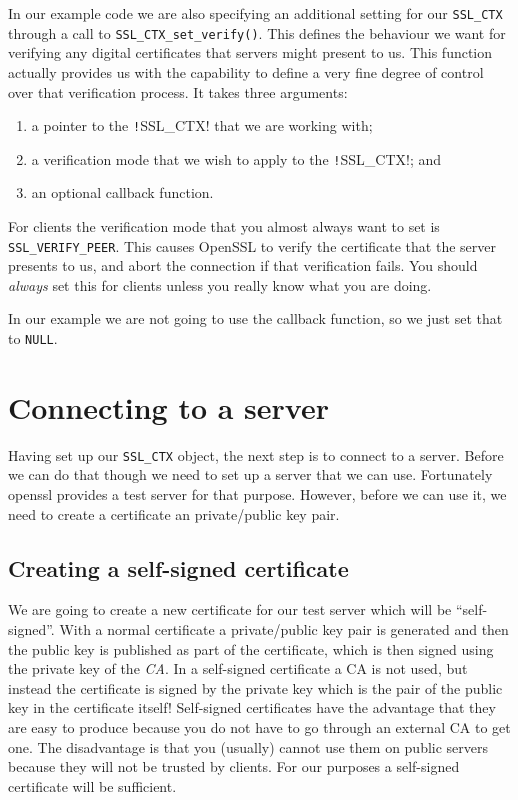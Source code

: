 In our example code we are also specifying an additional setting for our
\verb!SSL_CTX! through a call to \verb!SSL_CTX_set_verify()!. This defines the 
behaviour we want for verifying any digital certificates that servers might
present to us. This function actually provides us with the capability to define 
a very fine degree of control over that verification process. It takes three 
arguments:
\begin{enumerate}
\item a pointer to the \texttt!SSL\_CTX! that we are working with;
\item a verification mode that we wish to apply to the \texttt!SSL\_CTX!; and
\item an optional callback function.
\end{enumerate}

For clients the verification mode that you almost always want to set is 
\verb!SSL_VERIFY_PEER!. This causes OpenSSL to verify the certificate that the 
server presents to us, and abort the connection if that verification fails. You
should \emph{always} set this for clients unless you really know what you are 
doing.

In our example we are not going to use the callback function, so we just set 
that to \verb!NULL!.

\section {Connecting to a server}

Having set up our \verb!SSL_CTX! object, the next step is to connect to a
server.  Before we can do that though we need to set up a server that we can
use.  Fortunately openssl provides a test server for that purpose. However,
before we  can use it, we need to create a certificate an private/public key
pair.

\subsection {Creating a self-signed certificate}

We are going to create a new certificate for our test server which will be 
``self-signed''. With a normal certificate a private/public key pair is
generated and then the public key is published as part of the certificate, 
which is then signed using the private key of the \emph{CA}. In a self-signed 
certificate a CA is not used, but instead the certificate is signed by the 
private key which is the pair of the public key in the certificate itself! 
Self-signed certificates have the advantage that they are easy to produce 
because you do not have to go through an external CA to get one. The 
disadvantage is that you (usually) cannot use them on public servers because 
they will not be trusted by clients. For our purposes a self-signed certificate 
will be sufficient.

